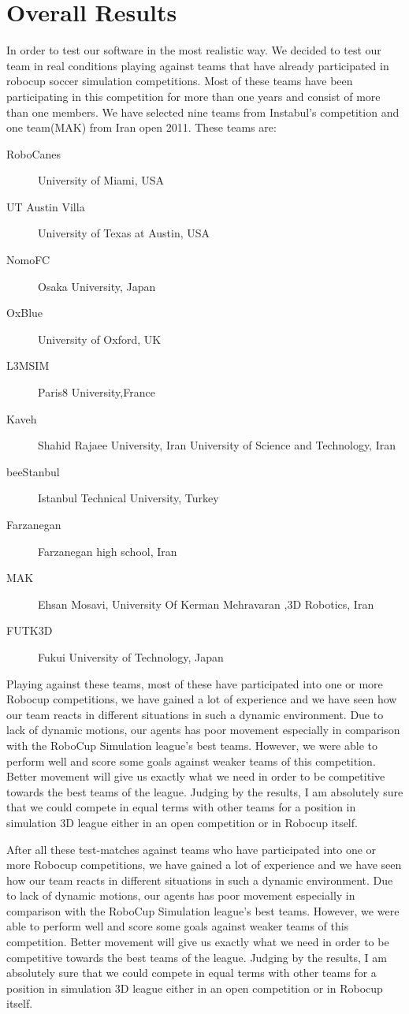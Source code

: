 \section{Overall Results}
In order to test our software in the most realistic way. We decided to test our team in real conditions playing against teams that have already participated in robocup soccer simulation competitions. Most of these teams have been participating in this competition for more than one years and consist of more than one members. We have selected nine teams from Instabul's competition and one team(MAK) from Iran open 2011. These teams are:
\begin{description}
\item[RoboCanes]	University of Miami, USA 
\item[UT Austin Villa]	University of Texas at Austin, USA
\item[NomoFC]	Osaka University, Japan
\item[OxBlue]	University of Oxford, UK
\item[L3MSIM]	Paris8 University,France
\item[Kaveh] 	Shahid Rajaee University, Iran University of Science and Technology, Iran
\item[beeStanbul]	Istanbul Technical University, Turkey
\item[Farzanegan]	Farzanegan high school, Iran
\item[MAK]	Ehsan Mosavi, University Of Kerman Mehravaran ,3D Robotics, Iran
\item[FUTK3D]	Fukui University of Technology, Japan
\end{description}
Playing against these teams, most of these have participated into one or more Robocup competitions, we have gained a lot of experience and we have seen how our team reacts in different situations in such a dynamic environment. Due to lack of dynamic motions, our agents has poor movement especially in comparison with the RoboCup Simulation league's best teams. However, we were able to perform well and score some goals against weaker teams of this competition. Better movement will give us exactly what we need in order to be competitive towards the best teams of the league. Judging by the results, I am absolutely sure that we could compete in equal terms with other teams for a position in simulation 3D league either in an open competition or in Robocup itself.

After all these test-matches against teams who have participated into one or more Robocup competitions, we have gained a lot of experience and we have seen how our team reacts in different situations in such a dynamic environment. Due to lack of dynamic motions, our agents has poor movement especially in comparison with the RoboCup Simulation league's best teams. However, we were able to perform well and score some goals against weaker teams of this competition. Better movement will give us exactly what we need in order to be competitive towards the best teams of the league. Judging by the results, I am absolutely sure that we could compete in equal terms with other teams for a position in simulation 3D league either in an open competition or in Robocup itself.

